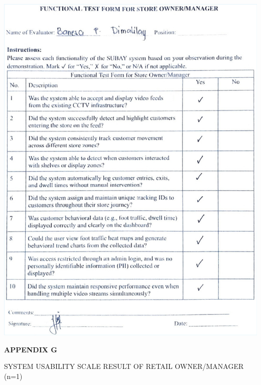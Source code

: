 \begin{center}
	\includegraphics[width=1\textwidth]{app/F.pdf}
\end{center}

\clearpage

\begin{center}
	{\bf APPENDIX G}\\[24pt]
\end{center}

\begin{center}
	SYSTEM USABILITY SCALE RESULT OF RETAIL OWNER/MANAGER (n=1)
\end{center}

